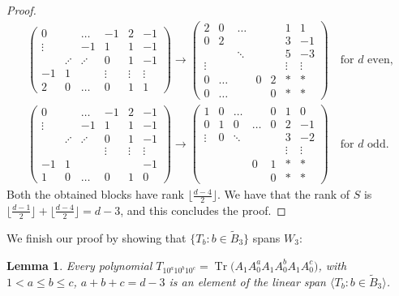 \documentclass[10pt,a4paper]{amsart}
\numberwithin{equation}{section}
\newtheorem{Lemma}[Theorem]{Lemma}
\DeclareMathOperator{\Tr}{Tr}
\begin{document}
\begin{proof}
\begin{gather*}
 \begin{pmatrix}
0 	&	& \dots  & -1 & 2 & -1 \\
\vdots& 	&     -1   & 1 & 1 & -1 \\
&  	\iddots	& \iddots& 0 & 1 & -1 \\
 -1&  1  	&		 &\vdots&\vdots&\vdots\\
 2 &0& \dots &0&1&1
 \end{pmatrix} \to
 \begin{pmatrix}
 2 & 0 & \dots &&& 1 & 1\\
 0 & 2 & &&&3&-1\\
   &  & \ddots&&&5&-3\\
 \vdots & &&&&\vdots&\vdots\\
 0 &\dots&&0&2&*& *\\
 0 &\dots&&&0&*& *
 \end{pmatrix}\quad \text{for }d \text{ even},
\\
 \begin{pmatrix}
0 	&	& \dots  & -1 & 2 & -1 \\
\vdots& 	&       -1 & 1 & 1 & -1 \\
&  	\iddots	& \iddots& 0 & 1 & -1 \\
&    	&		 &\vdots&\vdots&\vdots\\
-1& 1 & &&&-1\\
1 &0& \dots &0&1&0
 \end{pmatrix} \to
\begin{pmatrix}
1       & 0 &\dots&     &0 &1 &0 \\
0       & 1 & 0       &\dots&0 &2 &-1\\
\vdots  & 0 &\ddots   &&&3&-2\\
 &  &&&&\vdots&\vdots\\
 &&&0&1&*&*\\
 &&&&0&*&*
 \end{pmatrix}\quad \text{for }d\text{ odd}.
 \end{gather*}
Both the obtained blocks have rank $\big\lfloor \frac{d-4}{2}\big\rfloor$. We have that the rank of $S$ is $\big\lfloor \frac{d-1}{2}\big\rfloor+\big\lfloor \frac{d-4}{2}\big\rfloor=d-3$, and this concludes the proof.
\end{proof}

We finish our proof by showing that $\big\{T_b\colon b\in \tilde{B}_3\big\}$ spans $W_3$:
\begin{Lemma}\label{lemma:w3Spanning}
	Every polynomial
	 $T_{10^a10^b10^c}=\Tr\big(A_1A_0^aA_1A_0^bA_1A_0^c\big)$, with $1< a\leq b\leq c$, $a+b+c=d-3$ is an element of the linear span $\big\langle T_b\colon b\in \tilde{B}_3\big\rangle$.
\end{Lemma}
\end{document}
